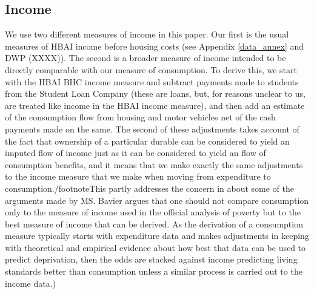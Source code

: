 \subsection{Income}
We use two different measures of income in this paper.  Our first is the usual measures of HBAI income before housing costs (see Appendix \ref{data_annex} and DWP (XXXX)). The second is a broader measure of income intended to be directly comparable with our measure of consumption. To derive this, we start with the HBAI BHC income measure and subtract payments made to students from the Student Loan Company (these are loans, but, for reasons unclear to us, are treated like income in the HBAI income measure), and then add an estimate of the consumption flow from housing and motor vehicles net of the cash payments made on the same. The second of these adjustments takes account of the fact that ownership of a particular durable can be considered to yield an imputed flow of income just as it can be considered to yield an flow of consumption benefits, and it means that we make exactly the same adjustments to the income measure that we make when moving from expenditure to consumption./footnote{This partly addresses the concern in \cite{Bavier2008} about some of the arguments made by MS. Bavier argues that one should not compare consumption only to the measure of income used in the official analysis of poverty but to the best measure of income that can be derived. As the derivation of a consumption measure typically starts with expenditure data and makes adjustments in keeping with theoretical and empirical evidence about how best that data can be used to predict deprivation, then the odds are stacked against income predicting living standards better than consumption unless a similar process is carried out to the income data.}) 

